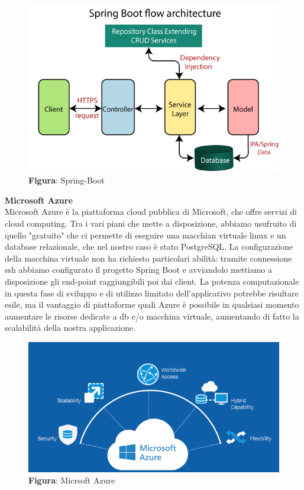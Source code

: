     \begin{figure}[H]
        \centering
        \includegraphics[scale=0.3]{assets/immagini varie/spring-boot-architecture2.png}
        \caption*{\textbf{Figura}: Spring-Boot}\label{fig:spring_Arch}
    \end{figure}
    \newpage

    \begin{flushleft}
        \textbf{Microsoft Azure}\\
        Microsoft Azure è la piattaforma cloud pubblica di Microsoft, che offre servizi di cloud computing. Tra i vari piani che mette a disposizione, abbiamo usufruito
        di quello "gratuito" che ci permette di eseguire una macchian virtuale linux e un database relazionale, che nel nostro caso è stato PostgreSQL.
        La configurazione della macchina virtuale non ha richiesto particolari abilità: tramite connessione ssh abbiamo configurato il progetto Spring Boot e avviandolo 
        mettiamo a disposizione gli end-point raggiungibili poi dai client.
        La potenza computazionale in questa fase di sviluppo e di utilizzo limitato dell'applicativo potrebbe risultare esile, ma il vantaggio di piattaforme quali
        Azure è possibile in qualsiasi momento aumentare le risorse dedicate a db e/o macchina virtuale, aumentando di fatto la scalabilità della nostra applicazione.

    \end{flushleft}

    \begin{figure}[H]
        \centering
        \includegraphics[scale=0.5]{assets/immagini varie/azure loc.png}
        \caption*{\textbf{Figura}: Micrsoft Azure}\label{fig:mic_az}
    \end{figure}